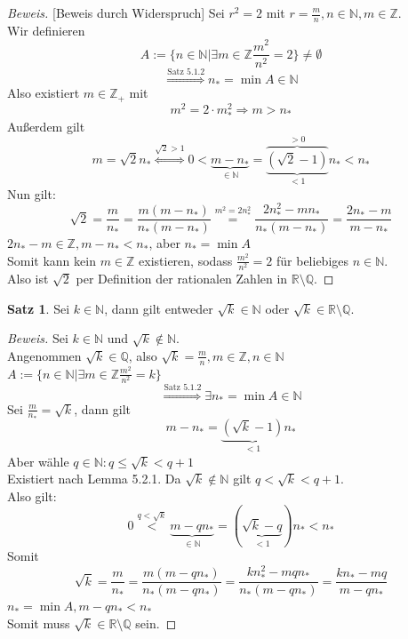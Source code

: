 \documentclass[12pt,a4paper,titlepage]{article} %
\theoremstyle{definition}
\newtheorem{satz}{Satz}[subsection]
\theoremstyle{remark}
\newenvironment{bew}{\begin{proof}[Beweis]}{\end{proof}}
\newcommand{\N}{\mathbb{N}}
\newcommand{\Q}{\mathbb{Q}}
\newcommand{\R}{\mathbb{R}}
\begin{document}
\begin{bew}[Beweis durch Widerspruch]
	Sei $r^2=2$ mit $r = \frac{m}{n}, n\in\mathbb{N}, m\in\mathbb{Z}$.\\
	Wir definieren $$A:= \{n\in\mathbb{N}|\exists m\in\mathbb{Z} \frac{m^2}{n^2}= 2\} \neq \emptyset$$
	$$\overset{\text{Satz 5.1.2}}{\Rightarrow} n_* = \min A \in \mathbb{N}$$
	Also existiert $m\in\mathbb{Z}_+$ mit 
	$$m^2 = 2\cdot m_*^2 \Rightarrow m>n_*$$
	Außerdem gilt 
	$$m=\sqrt{2}n_* \overset{\sqrt{2}>1}{\Leftrightarrow} 0< \underbrace{m-n_*}_{\in\mathbb{N}} = \underbrace{\overbrace{(\sqrt{2} - 1)}}^{>0}_{<1} n_* < n_*$$
	Nun gilt: $$\sqrt{2} = \frac{m}{n_*} = \frac{m(m-n_*)}{n_*(m-n_*)} \overset{m^2=2n_*^2}{=} \frac{2n_*^2-mn_*}{n_*(m-n_*)} = \frac{2n_*-m}{m-n_*}$$ 
	\Lightning $2n_* -m \in \mathbb{Z}, m-n_* < n_*$, aber $n_* = \min A$\\
	Somit kann kein $m\in\mathbb{Z}$ existieren, sodass $\frac{m^2}{n^2} = 2$ für beliebiges $n\in\mathbb{N}.$\\
	Also ist $\sqrt{2}$ per Definition der rationalen Zahlen in $\mathbb{R}\setminus\mathbb{Q}$.
\end{bew}
\begin{satz}
	Sei $k\in\mathbb{N}$, dann gilt entweder $\sqrt{k}\in\mathbb{N}$ oder $\sqrt{k}\in\mathbb{R}\setminus\mathbb{Q}$.
\end{satz}
\begin{bew}
	Sei $k\in\mathbb{N}$ und $\sqrt{k} \notin \mathbb{N}$.\\
	Angenommen $\sqrt{k}\in\mathbb{Q}$, also $\sqrt{k} = \frac{m}{n}, m\in\mathbb{Z},n\in\mathbb{N}$\\
	$A:=\{n\in\mathbb{N}|\exists m\in\mathbb{Z} \frac{m^2}{n^2} = k\}$
	$$\overset{\text{Satz 5.1.2}}{\Rightarrow}\exists n_* = \min A \in \N$$ 
	Sei $\frac{m}{n_*} = \sqrt{k}$, dann gilt
	$$m-n_* = \underbrace{(\sqrt{k}-1)}_{<1} n_*$$ %
	Aber wähle $q\in\N: q\leq \sqrt{k} < q+1$\\
	Existiert nach Lemma 5.2.1. Da $\sqrt{k} \notin \N$ gilt $q<\sqrt{k}<q+1$.\\
	Also gilt:
	$$0\overset{q<\sqrt{k}}{<} \underbrace{m-qn_*}_{\in\mathbb{N}} = (\underbrace{\sqrt{k}-q}_{<1})n_* < n_*$$
	Somit $$\sqrt{k} = \frac{m}{n_*} = \frac{m(m-qn_*)}{n_*(m-qn_*)} = \frac{kn_*^2 - mqn_*}{n_*(m-qn_*)}=\frac{kn_*-mq}{m-qn_*}$$
	\Lightning $n_* = \min A, m-qn_* < n_*$\\
	Somit muss $\sqrt{k}\in\R\setminus\Q$ sein. 
\end{bew}
\end{document}
